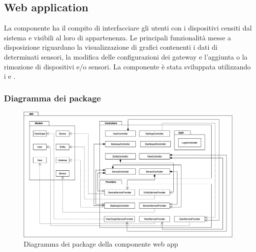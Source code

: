 \subsection{Web application}
	La componente  ha il compito di interfacciare gli utenti con i dispositivi censiti dal sistema e visibili al loro  di appartenenza.
	\newline
	Le principali funzionalità messe a disposizione riguardano la visualizzazione di grafici contenenti i dati di determinati sensori, la modifica delle configurazioni dei gateway e l'aggiunta o la rimozione di dispositivi e/o sensori.
	\newline 
	La componente è stata sviluppata utilizzando i  e .
	
	\subsubsection{Diagramma dei package}%
		\begin{figure}[H]
			\centering
			\includegraphics[scale=0.450]{res/images/WEBAPP/WebAppPackage.png}
			\caption{Diagramma dei package della componente web app}
			\label{Diagramma 21}
		\end{figure}
	
